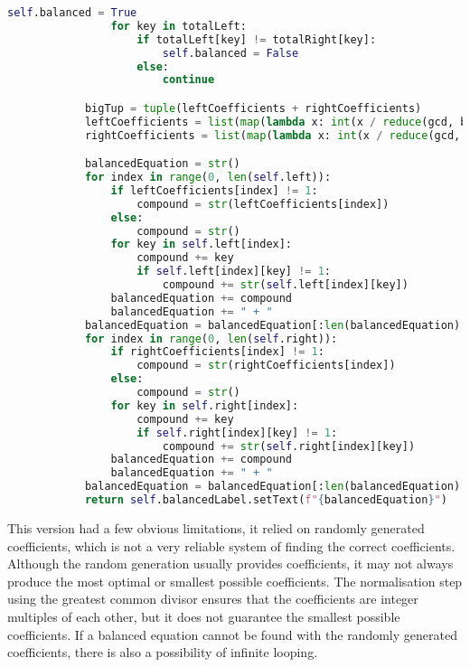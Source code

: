 \documentclass[a4paper,12pt]{article}
\begin{document}
\begin{lstlisting}[language=Python, caption=balance method]
                self.balanced = True
                for key in totalLeft:
                    if totalLeft[key] != totalRight[key]:
                        self.balanced = False
                    else:
                        continue

            bigTup = tuple(leftCoefficients + rightCoefficients)
            leftCoefficients = list(map(lambda x: int(x / reduce(gcd, bigTup)), leftCoefficients))
            rightCoefficients = list(map(lambda x: int(x / reduce(gcd, bigTup)), rightCoefficients))

            balancedEquation = str()
            for index in range(0, len(self.left)):
                if leftCoefficients[index] != 1:
                    compound = str(leftCoefficients[index])
                else:
                    compound = str()
                for key in self.left[index]:
                    compound += key
                    if self.left[index][key] != 1:
                        compound += str(self.left[index][key])
                balancedEquation += compound
                balancedEquation += " + "
            balancedEquation = balancedEquation[:len(balancedEquation) - 3] + " = "
            for index in range(0, len(self.right)):
                if rightCoefficients[index] != 1:
                    compound = str(rightCoefficients[index])
                else:
                    compound = str()
                for key in self.right[index]:
                    compound += key
                    if self.right[index][key] != 1:
                        compound += str(self.right[index][key])
                balancedEquation += compound
                balancedEquation += " + "
            balancedEquation = balancedEquation[:len(balancedEquation) - 2]
            return self.balancedLabel.setText(f"{balancedEquation}")
\end{lstlisting}

\newpage

This version had a few obvious limitations, it relied on randomly generated coefficients, which is not a very reliable system of finding the correct coefficients. Although the random generation usually provides coefficients, it  may not always produce the most optimal or smallest possible coefficients. The normalisation step using the greatest common divisor ensures that the coefficients are integer multiples of each other, but it does not guarantee the smallest 	possible coefficients. If a balanced equation cannot be found with the randomly generated coefficients, there is also a possibility of infinite looping.
\end{document}
